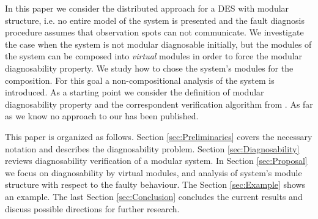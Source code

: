 \documentclass[a4paper, 10pt, conference]{ieeeconf}
\begin{document}
In this paper we consider the distributed approach for a DES with modular
structure, i.e. no entire model of the system is presented and the fault
diagnosis procedure assumes that observation spots can not communicate. We
investigate the case when the system is not modular diagnosable initially, but
the modules of the system can be composed into \emph{virtual} modules in order
to force the modular diagnosability property. We study how to chose the system's
modules for the composition. For this goal a non-compositional analysis of the
system is introduced.
As a starting point we consider the definition of modular diagnosability
property and the correspondent verification algorithm from
\cite{contant_diagnosability_2006}. As far as we know no approach to our has
been published.

This paper is organized as follows. Section \ref{sec:Preliminaries} covers the
necessary notation and describes the diagnosability problem. Section
\ref{sec:Diagnosability} reviews diagnosability verification of a modular
system. In Section \ref{sec:Proposal} we focus on diagnosability by virtual
modules, and analysis of system's module structure with respect to the faulty
behaviour. The Section \ref{sec:Example} shows an example. The last Section
\ref{sec:Conclusion} concludes the current results and discuss possible
directions for further research.
\end{document}
